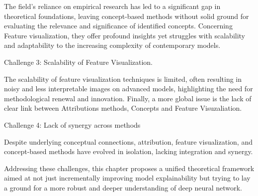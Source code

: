 The field's reliance on empirical research has led to a significant gap in theoretical foundations, leaving concept-based methods without solid ground for evaluating the relevance and significance of identified concepts.
Concerning Feature visualization, they offer profound insights yet struggles with scalability and adaptability to the increasing complexity of contemporary models.

\begin{customchallenge}{Challenge 3: Scalability of Feature Visualization.}
\end{customchallenge}

The scalability of feature visualization techniques is limited, often resulting in noisy and less interpretable images on advanced models, highlighting the need for methodological renewal and innovation.
Finally, a more global issue is the lack of clear link between Attributions methods, Concepts and Feature Visuzaliation. 

\begin{customchallenge}{Challenge 4: Lack of synergy across methods}
\end{customchallenge}

Despite underlying conceptual connections, attribution, feature visualization, and concept-based methods have evolved in isolation, lacking integration and synergy.

Addressing these challenges, this chapter proposes a unified theoretical framework aimed at not just incrementally improving model explainability but trying to lay a ground for a more robust and deeper understanding of deep neural network. 
